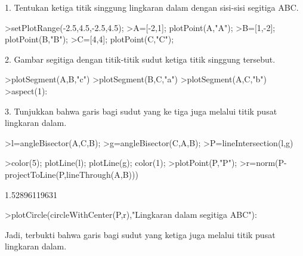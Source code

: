 \documentclass[a4paper,10pt]{article}
\begin{document}
\begin{eulernotebook}
\begin{eulercomment}
\begin{eulercomment}
\begin{eulercomment}
\begin{eulercomment}
\begin{eulercomment}
\begin{eulercomment}
\begin{eulercomment}
\begin{eulercomment}
\begin{eulercomment}
\begin{eulercomment}
\begin{eulercomment}
\begin{eulercomment}
\begin{eulercomment}
\begin{eulercomment}
\begin{eulercomment}
\begin{eulercomment}
\begin{eulercomment}
\begin{eulercomment}
\begin{eulercomment}
1. Tentukan ketiga titik singgung lingkaran dalam dengan sisi-sisi
segitiga ABC.
\end{eulercomment}
\begin{eulerprompt}
>setPlotRange(-2.5,4.5,-2.5,4.5);
>A=[-2,1]; plotPoint(A,"A");
>B=[1,-2]; plotPoint(B,"B");
>C=[4,4]; plotPoint(C,"C");
\end{eulerprompt}
\begin{eulercomment}
2. Gambar segitiga dengan titik-titik sudut ketiga titik singgung
tersebut.
\end{eulercomment}
\begin{eulerprompt}
>plotSegment(A,B,"c")
>plotSegment(B,C,"a")
>plotSegment(A,C,"b")
>aspect(1):
\end{eulerprompt}
\begin{eulercomment}
3. Tunjukkan bahwa garis bagi sudut yang ke tiga juga melalui titik
pusat lingkaran dalam.
\end{eulercomment}
\begin{eulerprompt}
>l=angleBisector(A,C,B);
>g=angleBisector(C,A,B);
>P=lineIntersection(l,g)
\end{eulerprompt}
\begin{euleroutput}
  [0.581139,  0.581139]
\end{euleroutput}
\begin{eulerprompt}
>color(5); plotLine(l); plotLine(g); color(1);
>plotPoint(P,"P");
>r=norm(P-projectToLine(P,lineThrough(A,B)))
\end{eulerprompt}
\begin{euleroutput}
  1.52896119631
\end{euleroutput}
\begin{eulerprompt}
>plotCircle(circleWithCenter(P,r),"Lingkaran dalam segitiga ABC"):
\end{eulerprompt}
\begin{eulercomment}
Jadi, terbukti bahwa garis bagi sudut yang ketiga juga melalui titik
pusat lingkaran dalam.



\end{eulercomment}
\end{eulercomment}
\end{eulercomment}
\end{eulercomment}
\end{eulercomment}
\end{eulercomment}
\end{eulercomment}
\end{eulercomment}
\end{eulercomment}
\end{eulercomment}
\end{eulercomment}
\end{eulercomment}
\end{eulercomment}
\end{eulercomment}
\end{eulercomment}
\end{eulercomment}
\end{eulercomment}
\end{eulercomment}
\end{eulercomment}
\end{eulernotebook}
\end{document}
